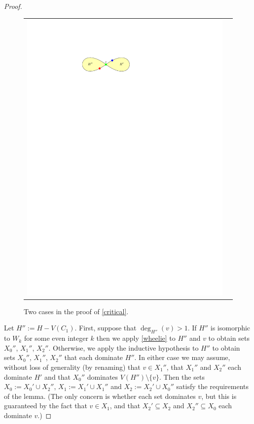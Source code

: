 \documentclass{article}
\theoremstyle{definition}
\begin{document}
\begin{proof}
\begin{figure}[htbp]
\begin{tabular}{cc}
      \includegraphics[page=2]{figs/critical_3_colouring}
    \end{tabular}
    \caption{Two cases in the proof of \cref{critical}.}
    \label{critical_3_colouring}
  \end{figure}

  Let $H'':=H-V(C_1)$. First, suppose that $\deg_{H''}(v)>1$.
  If $H''$ is isomorphic to $W_k$ for some even integer $k$ then we apply \cref{wheelie} to $H''$ and $v$ to obtain sets $X_0''$, $X_1''$, $X_2''$. Otherwise, we apply the inductive hypothesis to $H''$ to obtain sets $X_0''$, $X_1''$, $X_2''$ that each dominate $H''$. In either case we may assume, without loss of generality (by renaming) that $v\in X_1''$, that $X_1''$ and $X_2''$ each dominate $H'$ and that $X_0''$ dominates $V(H'')\setminus\{v\}$.  Then the sets $X_0:=X_0'\cup X_2''$, $X_1:=X_1'\cup X_1''$ and $X_2:=X_2'\cup X_0''$ satisfy the requirements of the lemma.  (The only concern is whether each set dominates $v$, but this is guaranteed by the fact that $v\in X_1$, and that $X_2'\subseteq X_2$ and $X_2''\subseteq X_0$ each dominate $v$.)


\end{proof}
\end{document}
